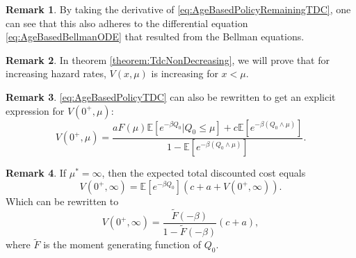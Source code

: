 \documentclass[a4paper]{thesis}
\theoremstyle{definition}
\newtheorem{remark}{Remark}[chapter]
\begin{document}
\begin{remark}
	By taking the derivative of \eqref{eq:AgeBasedPolicyRemainingTDC}, one can see that this also adheres to the differential equation \eqref{eq:AgeBasedBellmanODE} that resulted from the Bellman equations.
\end{remark}

\begin{remark}
	In theorem \ref{theorem:TdcNonDecreasing}, we will prove that for increasing hazard rates, $V(x,\mu)$ is increasing for $x<\mu$.
\end{remark}

\begin{remark}
	\eqref{eq:AgeBasedPolicyTDC} can also be rewritten to get an explicit expression for $V(0^+,\mu)$:
	\begin{equation}\label{eq:AgeBasedOptimalTDC}
	V(0^+,\mu)=\frac{aF(\mu)\mathbb{E}[e^{-\beta Q_0}|Q_0\leq \mu]+c\mathbb{E}[e^{-\beta(Q_0\wedge\mu)}]}{1-\mathbb{E}[e^{-\beta (Q_0\wedge\mu)}]}.
	\end{equation}
\end{remark}

\begin{remark}
	If $\mu^*=\infty$, then the expected total discounted cost equals
	\[V(0^+,\infty)=\mathbb{E}[e^{-\beta Q_0}](c+a+V(0^+,\infty)).\]
	Which can be rewritten to
	\[V(0^+,\infty)=\frac{\tilde{F}(-\beta)}{1-\tilde{F}(-\beta)}(c+a),\]
	where $\tilde{F}$ is the moment generating function of $Q_0$.
\end{remark}
\end{document}
